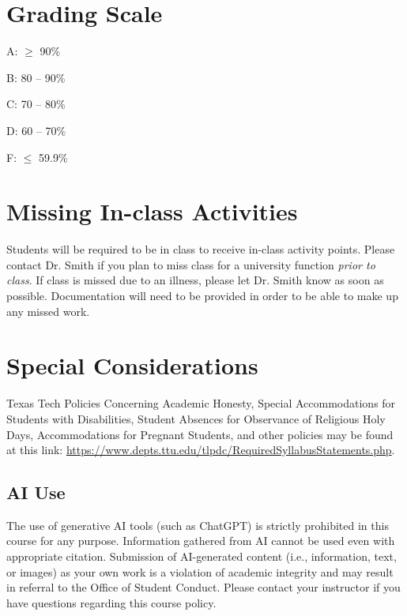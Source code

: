 \documentclass[12pt, notitlepage]{article}   	%
\begin{document}
{\section{Grading Scale}
A: $\geq$ 90\% \par
B: 80 – 90\% \par
C: 70 – 80\% \par
D: 60 – 70\% \par
F: $\leq$ 59.9\% \par

\section{Missing In-class Activities}
Students will be required to be in class to receive in-class activity points. 
Please contact Dr. Smith if you plan to miss class for a university function 
\textit{prior to class}. If class is missed due to an illness, 
please let Dr. Smith know as soon as possible. Documentation will need to be provided
in order to be able to make up any missed work.

\section{Special Considerations}
Texas Tech Policies Concerning Academic Honesty, Special Accommodations for 
Students with Disabilities, Student Absences for Observance of Religious Holy Days, 
Accommodations for Pregnant Students, and other policies may be found at this link: 
\url{https://www.depts.ttu.edu/tlpdc/RequiredSyllabusStatements.php}.

\subsection{AI Use}
The use of generative AI tools (such as ChatGPT) is strictly prohibited in this course for any purpose.
Information gathered from AI cannot be used even with appropriate citation. Submission of AI-generated
content (i.e., information, text, or images) as your own work is a violation of academic integrity and may
result in referral to the Office of Student Conduct. Please contact your instructor if you have questions
regarding this course policy.

}
\end{document}
